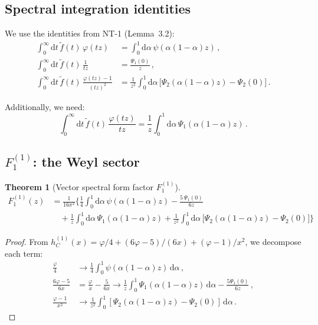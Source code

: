 \documentclass[11pt,a4paper]{article}
\newcommand{\dd}{\mathrm{d}}
\newtheorem{theorem}{Theorem}[section]
\theoremstyle{definition}
\theoremstyle{remark}
\begin{document}
\subsection{Spectral integration identities}

We use the identities from NT-1 (Lemma~3.2):
\begin{align}
  \int_0^\infty \dd t\,\tilde{f}(t)\,\varphi(tz)
  &= \int_0^1 \dd\alpha\,\psi(\alpha(1-\alpha)z)\,,
  \label{eq:int-phi}\\[4pt]
  \int_0^\infty \dd t\,\tilde{f}(t)\,\frac{1}{tz}
  &= \frac{\Psi_1(0)}{z}\,,
  \label{eq:int-1-over-x}\\[4pt]
  \int_0^\infty \dd t\,\tilde{f}(t)\,\frac{\varphi(tz)-1}{(tz)^2}
  &= \frac{1}{z^2}\int_0^1 \dd\alpha\,\bigl[
  \Psi_2(\alpha(1-\alpha)z) - \Psi_2(0)\bigr]\,.
  \label{eq:int-phim1-over-x2}
\end{align}

Additionally, we need:
\begin{equation}
  \int_0^\infty \dd t\,\tilde{f}(t)\,\frac{\varphi(tz)}{tz}
  = \frac{1}{z}\int_0^1 \dd\alpha\,\Psi_1(\alpha(1-\alpha)z)\,.
  \label{eq:int-phi-over-x}
\end{equation}


\subsection{$F_1^{(1)}$: the Weyl sector}

\begin{theorem}[Vector spectral form factor $F_1^{(1)}$]
\label{thm:F1}
\begin{equation}
  \boxed{
  \begin{aligned}
  F_1^{(1)}(z) &= \frac{1}{16\pi^2}\Biggl\{
    \frac{1}{4}\int_0^1\!\dd\alpha\,\psi(\alpha(1-\alpha)z)
    - \frac{5\,\Psi_1(0)}{6z}\\
  &\quad
    + \frac{1}{z}\int_0^1\!\dd\alpha\,\Psi_1(\alpha(1-\alpha)z)
    + \frac{1}{z^2}\int_0^1\!\dd\alpha\,
      \bigl[\Psi_2(\alpha(1-\alpha)z) - \Psi_2(0)\bigr]
  \Biggr\}
  \end{aligned}
  }
  \label{eq:F1}
\end{equation}
\end{theorem}

\begin{proof}
From $h_C^{(1)}(x) = \varphi/4 + (6\varphi-5)/(6x) + (\varphi-1)/x^2$,
we decompose each term:
\begin{align*}
  \frac{\varphi}{4} &\to \frac{1}{4}\int_0^1\psi(\alpha(1-\alpha)z)\,
  \dd\alpha\,,\\
  \frac{6\varphi-5}{6x} &= \frac{\varphi}{x} - \frac{5}{6x}
  \to \frac{1}{z}\int_0^1\Psi_1(\alpha(1-\alpha)z)\,\dd\alpha
  - \frac{5\Psi_1(0)}{6z}\,,\\
  \frac{\varphi-1}{x^2} &\to
  \frac{1}{z^2}\int_0^1[\Psi_2(\alpha(1-\alpha)z) - \Psi_2(0)]\,\dd\alpha\,.
\end{align*}
\end{proof}
\end{document}
